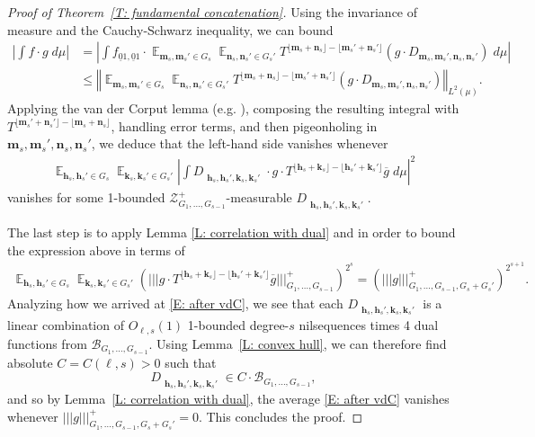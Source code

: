 \documentclass[11pt]{amsart}
\theoremstyle{definition}
\DeclareMathOperator*{\E}{\mathbb{E}}
\newcommand{\CB}{{\mathcal B}}
\newcommand{\CZ}{{\mathcal Z}}
\newcommand{\bm}{{\mathbf{m}}}
\newcommand{\bn}{{\mathbf{n}}}
\newcommand{\bh}{{\mathbf{h}}}
\newcommand{\bk}{{\mathbf{k}}}
\newcommand{\norm}[1]{\left\Vert #1\right\Vert}
\newcommand{\nnorm}[1]{\lvert\!|\!| #1|\!|\!\rvert}
\newcommand{\1}{{\mathbf{1}}}
\newcommand{\abs}[1]{\mathopen{}\left| #1\mathclose{}\right|}
\newcommand{\brac}[1]{\mathopen{}\left( #1 \mathclose{}\right)}
\newcommand{\sfloor}[1]{{\lfloor #1 \rfloor}}
\begin{document}
\begin{proof}[Proof of Theorem~\ref{T: fundamental concatenation}]
Using the invariance of measure and the Cauchy-Schwarz inequality, we can bound
\begin{align*}
    \abs{\int f\cdot g\; d\mu} &= \abs{\int f_{\underline{0}1, \underline{0}1} \cdot \E_{\bm_s,\bm_s'\in G_s} \E_{\bn_s,\bn_s'\in G_s'} %
    T^{\sfloor{\bm_s+\bn_s}-\sfloor{\bm_s'+\bn_s'}}(g\cdot D_{\bm_s,\bm_s', \bn_s,\bn_s'})\; d\mu}\\
    &\leq \norm{\E_{\bm_s,\bm_s'\in G_s} \E_{\bn_s,\bn_s'\in G_s'} %
    T^{\sfloor{\bm_s+\bn_s}-\sfloor{\bm_s'+\bn_s'}}(g\cdot D_{\bm_s,\bm_s', \bn_s,\bn_s'})}_{L^2(\mu)}.
\end{align*}
Applying the van der Corput lemma (e.g. \cite[Lemma 2.1]{DKS22}), composing the resulting integral with $T^{\sfloor{\bm_s'+\bn_s'}- \sfloor{\bm_s+\bn_s}}$, handling error terms, and then pigeonholing in $\bm_s,\bm_s',\bn_s,\bn_s'$, we deduce that the left-hand side vanishes whenever
\begin{align}\label{E: after vdC}
    \E_{\bh_s,\bh_s'\in G_s} \E_{\bk_s,\bk_s'\in G_s'}\abs{\int D_{\substack{\bh_s,\bh_s', \bk_s,\bk_s'}} \cdot g\cdot T^{\sfloor{\bh_s+\bk_s}-\sfloor{\bh_s'+\bk_s'}}\overline{g}\; d\mu}^2
\end{align}
vanishes for some
1-bounded $\CZ^+_{G_1, \ldots, G_{s-1}}$-measurable $D_{\substack{\bh_s,\bh_s', \bk_s,\bk_s'}}$.

The last step is to apply Lemma \ref{L: correlation with dual} and \cite[Lemma 4.1]{DKKST24} in order to bound the expression above in terms of 
\begin{align*}
    \E_{\bh_s,\bh_s'\in G_s} \E_{\bk_s,\bk_s'\in G_s'}\brac{\nnorm{g\cdot T^{\sfloor{\bh_s+\bk_s}-\sfloor{\bh_s'+\bk_s'}}\overline{g}}_{G_1, \ldots, G_{s-1}}^+}^{2^s} = \brac{\nnorm{g}_{G_1, \ldots, G_{s-1}, G_s+G_s'}^+}^{2^{s+1}}.
\end{align*}
Analyzing how we arrived at \eqref{E: after vdC}, we see that each $D_{\substack{\bh_s,\bh_s', \bk_s,\bk_s'}}$ is a linear combination of $O_{\ell,s}(1)$ 1-bounded degree-$s$ nilsequences times 4 dual functions from $\CB_{G_1, \ldots, G_{s-1}}$. Using Lemma~\ref{L: convex hull}, we can therefore find absolute $C=C(\ell,s)>0$ such that $$D_{\substack{\bh_s,\bh_s', \bk_s,\bk_s'}}\in C\cdot \CB_{G_1, \ldots, G_{s-1}},$$ and so by Lemma~\ref{L: correlation with dual}, the average \eqref{E: after vdC} vanishes whenever $\nnorm{g}_{G_1, \ldots, G_{s-1}, G_s+G_s'}^+=0.$ This concludes the proof.
\end{proof}
\end{document}

